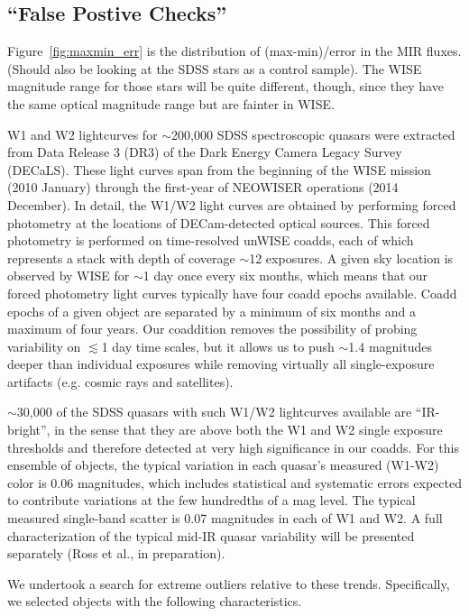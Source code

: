 \documentclass[apj]{emulateapj}
\begin{document}
\subsection{``False Postive Checks''}
Figure~\ref{fig:maxmin_err} is the distribution of (max-min)/error in
the MIR fluxes.  (Should also be looking at the SDSS stars as a
control sample).  The WISE magnitude
range for those stars will be quite different, though, since they have
the same optical magnitude range but are fainter in WISE.

W1 and W2 lightcurves for $\sim$200,000 SDSS spectroscopic quasars
were extracted from Data Release 3 (DR3) of the Dark Energy Camera
Legacy Survey (DECaLS). These light curves span from the beginning of
the WISE mission (2010 January) through the first-year of NEOWISER
operations (2014 December). In detail, the W1/W2 light curves are
obtained by performing forced photometry at the locations of
DECam-detected optical sources. This forced photometry is performed on
time-resolved unWISE coadds, each of which represents a stack with
depth of coverage $\sim$12 exposures. A given sky location is observed
by WISE for $\sim$1 day once every six months, which means that our
forced photometry light curves typically have four coadd epochs
available. Coadd epochs of a given object are separated by a minimum
of six months and a maximum of four years. Our coaddition removes the
possibility of probing variability on $\lesssim$1 day time scales, but
it allows us to push $\sim$1.4 magnitudes deeper than individual
exposures while removing virtually all single-exposure artifacts
(e.g. cosmic rays and satellites).

$\sim$30,000 of the SDSS quasars with such W1/W2 lightcurves available
are ``IR-bright'', in the sense that they are above both the W1 and W2
single exposure thresholds and therefore detected at very high
significance in our coadds. For this ensemble of objects, the typical
variation in each quasar's measured (W1-W2) color is 0.06 magnitudes,
which includes statistical and systematic errors expected to
contribute variations at the few hundredths of a mag level. The
typical measured single-band scatter is 0.07 magnitudes in each of W1
and W2. A full characterization of the typical mid-IR quasar
variability will be presented separately (Ross et al., in
preparation).

We undertook a search for extreme outliers relative to these trends.
Specifically, we selected objects with the following characteristics.
\end{document}
